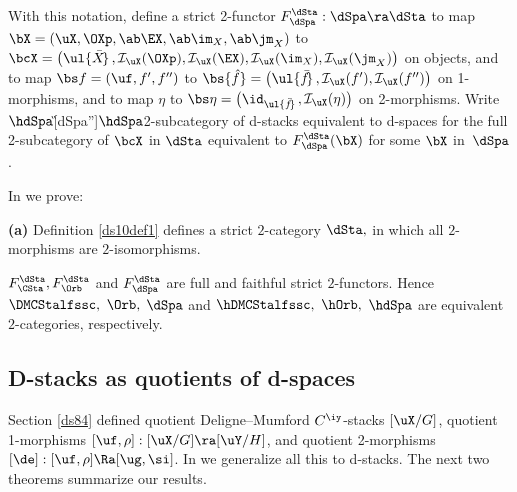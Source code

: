 \documentclass{article}
\begin{document}
\begin{dfn}
With this notation, define a strict 2-functor $F_\dSpa^\dSta:\dSpa \ra\dSta$ to map
$\bX=(\uX,\OXp,\ab\EX,\ab\im_X,\ab\jm_X)$ to $\bcX=\bigl(\ul{\bar
X\!}\,,{\cal I}_\uX(\OXp),{\cal I}_\uX(\EX),{\cal I}_\uX(\im_X),
{\cal I}_\uX(\jm_X)\bigr)$ on objects, and to map $\bs
f=(\uf,f',f'')$ to $\bs{\hat f}=\bigl(\ul{\bar f\!}\,,{\cal
I}_\uX(f'),{\cal I}_\uX(f'')\bigr)$ on 1-morphisms, and to map
$\eta$ to $\bs\eta=\bigl(\id_{\ul{\bar f\!}\,},{\cal
I}_\uX(\eta)\bigr)$ on 2-morphisms. Write
$\hdSpa$\G[dSpa'']{$\hdSpa$}{2-subcategory of d-stacks equivalent to
d-spaces} for the full 2-subcategory of $\bcX$ in $\dSta$ equivalent
to $F_\dSpa^\dSta(\bX)$ for some $\bX$
in~$\dSpa$.
\label{ds10def1}
\end{dfn}

In \cite[\S 9.2]{Joyc6} we prove:

\begin{thm}{\bf(a)} Definition\/ {\rm\ref{ds10def1}} defines a
strict\/ $2$-category $\dSta,$ in which all\/ $2$-morphisms are
$2$-isomorphisms.
\smallskip

 $F_\CSta^\dSta,F_\Orb^\dSta$ and\/ $F_\dSpa^\dSta$
are full and faithful strict\/
$2$-functors. Hence $\DMCStalfssc,$ $\Orb,$ $\dSpa$ and\/
$\hDMCStalfssc,$ $\hOrb,$ $\hdSpa$ are equivalent\/ $2$-categories,
respectively.
\label{ds10thm1}
\end{thm}

\subsection{D-stacks as quotients of d-spaces}
\label{ds102}

Section \ref{ds84} defined quotient Deligne--Mumford $C^\iy$-stacks
$[\uX/G]$, quotient 1-morphisms $[\uf,\rho]:[\uX/G]\ra[\uY/H]$, and
quotient 2-morphisms $[\de]:[\uf,\rho]\Ra[\ug,\si]$. In \cite[\S
9.3]{Joyc6} we generalize all this to d-stacks. The next two
theorems summarize our results.
\end{document}
